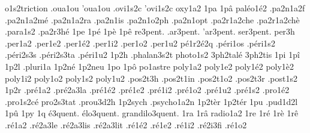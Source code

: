 {                    o1s2triction
                    .oua1ou
                    'oua1ou
                    .ovi1s2c
                    'ovi1s2c
                    oxy1a2
1pa
1p\^a
                    pal\'eo1\'e2
                    .pa2n1a2f
                    .pa2n1a2m\'e
                    .pa2n1a2ra
                    .pa2n1is
                    .pa2n1o2ph
                    .pa2n1opt
                    .pa2r1a2che
                    .pa2r1a2ch\`e
                    .para1s2
                    .pa2r3h\'e
1pe
1p\'e
1p\`e
1p\^e
 re3pent.
.ar3pent.
'ar3pent.
ser3pent.
                    per3h
                    .per1a2
                    .per1e2
                    .per1\'e2
                    .per1i2
                    .per1o2
                    .per1u2
                    p\'e1r2\'e2q %
                    .p\'eri1os
                    .p\'eri1s2
                    .p\'eri2s3s
                    .p\'eri2s3ta
                    .p\'eri1u2
1p2h
                    .phalan3s2t
                    photo1s2
                    3ph2tal\'e
                    3ph2tis
1pi
1p\^i
1p2l
                    .pluri1a
                    1p2n\'e
                    1p2neu
1po
1p\^o
                    po1astre
                    poly1a2
                    poly1e2
                    poly1\'e2
                    poly1\`e2
                    poly1i2
                    poly1o2
                    poly1s2
                    poly1u2
                    .pos2t3h
                    .pos2t1in
                    .pos2t1o2
                    .pos2t3r
                    .post1s2
1p2r
                    .pr\'e1a2
                    .pr\'e2a3la %
                    .pr\'e1\'e2
                    .pr\'e1e2
                    .pr\'e1i2
                    .pr\'e1o2
                    .pr\'e1u2
                    .pr\'e1s2
                    .pro1\'e2
                    .pro1s2c\'e
                    pro2s3tat
                    .prou3d2h
                    1p2sych
                    .psycho1a2n
                    1p2t\`er
                    1p2t\'er
1pu
                    .pud1d2l
1p\^u
1py
1q
     \'e3quent.
   \'elo3quent.
grandilo3quent.
1ra
1r\^a
                    radio1a2 %
1re
1r\'e
1r\`e
1r\^e
                    .r\'e1a2
                    .r\'e2a3le
                    .r\'e2a3lis
                    .r\'e2a3lit
                    .r\'e1\'e2
                    .r\'e1e2
                    .r\'e1i2
                    .r\'e2i3fi
                    .r\'e1o2
}
